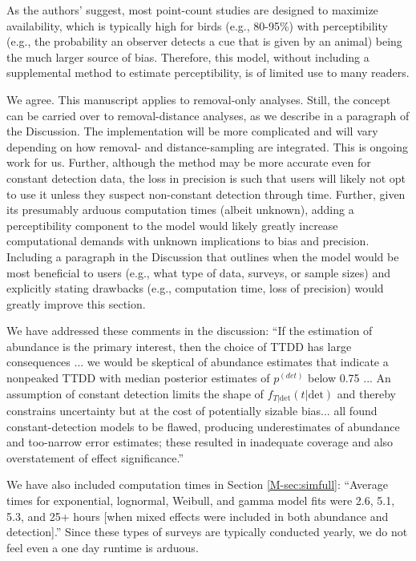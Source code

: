 \documentclass[12pt]{article}
\renewenvironment{quote}  %
              {\list{}{\rightmargin\leftmargin}\normalfont%
               \item\relax}
              {\endlist}
\newcommand{\pdet}{p^{(det)}}
\newcommand{\dt}{\text{det}}
\newcommand{\ftdt}{f_{T|\dt}(t|\dt)}
\begin{document}
As the authors’ suggest, most point-count studies are designed to maximize availability, which is typically high for birds (e.g., 80-95\%) with perceptibility (e.g., the probability an observer detects a cue that is given by an animal) being the much larger source of bias.  Therefore, this model, without including a supplemental method to estimate perceptibility, is of limited use to many readers.
\begin{quote}
We agree.
This manuscript applies to removal-only analyses.
Still, the concept can be carried over to removal-distance analyses, as we describe in a paragraph of the Discussion.
The implementation will be more complicated and will vary depending on how removal- and distance-sampling are integrated.
This is ongoing work for us.
\end{quote}
Further, although the method may be more accurate even for constant detection data, the loss in precision is such that users will likely not opt to use it unless they suspect non-constant detection through time.  Further, given its presumably arduous computation times (albeit unknown), adding a perceptibility component to the model would likely greatly increase computational demands with unknown implications to bias and precision.  Including a paragraph in the Discussion that outlines when the model would be most beneficial to users (e.g., what type of data, surveys, or sample sizes) and explicitly stating drawbacks (e.g., computation time, loss of precision) would greatly improve this section.  
\begin{quote}
We have addressed these comments in the discussion:
``If the estimation of abundance is the primary interest, 
then the choice of TTDD has large consequences ... we would be skeptical of 
abundance estimates that indicate a nonpeaked TTDD with median posterior 
estimates of $\pdet$ below 0.75 ...
An assumption of constant detection limits the shape of $\ftdt$ and 
thereby constrains uncertainty but at the cost of potentially sizable bias...
all found constant-detection models to be flawed, 
producing underestimates of abundance and too-narrow error estimates; 
these resulted in inadequate coverage and also overstatement of effect 
significance.''

We have also included computation times in Section \ref{M-sec:simfull}: 
``Average times for exponential, lognormal, Weibull, and gamma model fits were 
2.6, 5.1, 5.3, and 25+ hours [when mixed effects were included in both abundance 
and detection].'' Since these types of surveys are typically conducted yearly, 
we do not feel even a one day runtime is arduous.
\end{quote}
\end{document}
